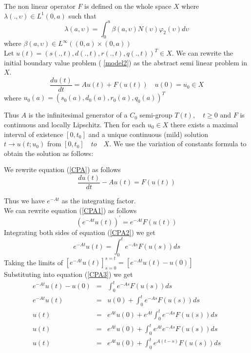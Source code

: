 The non linear operator $F$ is defined on the whole space $X$ where $\lambda (.,\upsilon) \in L^{1} (0,a)$ such that
$$\lambda (a,\upsilon)= \int_{0}^{a} \beta (a, \upsilon) N(\upsilon) \varphi_{2}(\upsilon) d \upsilon$$  where
$\beta (a, \upsilon) \in L^{\infty}( (0,a) \times (0,a)) $\\

Let $u(t) = (s(.,t),d(.,t),r(.,t),q(.,t))^T \in X$. We can rewrite the initial boundary value problem ( \ref{model2}) as the abstract semi linear problem in $X$.
\begin{equation}\label{CPA}
\frac{d u(t)}{dt} =A u(t) + F(u (t)) \quad u(0)= u_0 \in X
\end{equation}
where $u_{0}(a)=(s_{0}(a), d_{0}(a) , r_{0}(a) , q_{0}(a))^T$

Thus $A$ is the infinitesimal generator of a $C_0$ semi-group $T(t) , \quad t\geq 0$ and $F$ is continuous and locally Lipschitz. Then for each $u_0 \in X$ there exists a maximal interval of existence $[0, t_0]$ and a unique continuous (mild) solution $t\longrightarrow u(t;u_0)$ from $[0,t_0] \quad to \quad X$. We use the variation of constants formula to obtain the solution as follows:

We rewrite equation (\ref{CPA}) as follows
\begin{equation}\label{CPA1}
\frac{d u(t)}{dt}-A u(t) = F(u (t)) 
\end{equation}

Thus we have $e^{-At}$ as the integrating factor.\\

We can rewrite equation (\ref{CPA1})  as follows\\
\begin{equation}\label{CPA2}
(e^{-At}u(t))^'=e^{-At}F(u(t))
\end{equation}
Integrating both sides of equation (\ref{CPA2}) we get \\

\begin{equation}\label{CPA3}
e^{-At}u(t)=\int_{0}^t e^{-As}F(u(s))ds
\end{equation}
 Taking the limits of $[e^{-At}u(t)]_{s=0}^{s=t}=[e^{-At}u(t)-u(0)]$ \\
 
 Substituting into equation (\ref{CPA3}) we get 
 \begin{eqnarray}
 e^{-At}u(t)-u(0) &=&\int_{0}^t e^{-As}F(u(s))ds\nonumber \\
 e^{-At}u(t) &=&u(0)+\int_{0}^t e^{-As}F(u(s))ds\nonumber \\
 u(t) &=&e^{At}u(0)+e^{At}\int_{0}^t e^{-As}F(u(s))ds\nonumber \\
 u(t) &=&e^{At}u(0)+\int_{0}^t e^{At} e^{-As}F(u(s))ds\nonumber \\
 u(t) &=&e^{At}u(0)+\int_{0}^t e^{A(t-s)} F(u(s))ds\nonumber \\
 \end{eqnarray}
 
